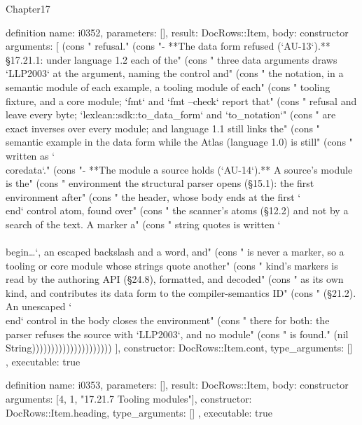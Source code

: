 \begin{lexlean}{Chapter17}
\begin{semanticmodule}
definition{
  name: i0352,
  parameters: [],
  result: DocRows::Item,
  body: constructor{
    arguments: [
      (cons "  refusal." (cons "- **The data form refused (`AU-13`).** §17.21.1: under language 1.2 each of the" (cons "  three data arguments draws `LLP2003` at the argument, naming the control and" (cons "  the notation, in a semantic module of each example, a tooling module of each" (cons "  tooling fixture, and a core module; `fmt` and `fmt --check` report that" (cons "  refusal and leave every byte; `lexlean::sdk::to_data_form` and `to_notation`" (cons "  are exact inverses over every module; and language 1.1 still links the" (cons "  semantic example in the data form while the Atlas (language 1.0) is still" (cons "  written as `\\coredata`." (cons "- **The module a source holds (`AU-14`).** A source's module is the" (cons "  environment the structural parser opens (§15.1): the first environment after" (cons "  the header, whose body ends at the first `\\end` control atom, found over" (cons "  the scanner's atoms (§12.2) and not by a search of the text. A marker a" (cons "  string quotes is written `\\\\begin{…}`, an escaped backslash and a word, and" (cons "  is never a marker, so a tooling or core module whose strings quote another" (cons "  kind's markers is read by the authoring API (§24.8), formatted, and decoded" (cons "  as its own kind, and contributes its data form to the compiler-semantics ID" (cons "  (§21.2). An unescaped `\\end` control in the body closes the environment" (cons "  there for both: the parser refuses the source with `LLP2003`, and no module" (cons "  is found." (nil String)))))))))))))))))))))
    ],
    constructor: DocRows::Item.cont,
    type_arguments: []
  },
  executable: true
}

definition{
  name: i0353,
  parameters: [],
  result: DocRows::Item,
  body: constructor{
    arguments: [4, 1, "17.21.7 Tooling modules"],
    constructor: DocRows::Item.heading,
    type_arguments: []
  },
  executable: true
}


\end{semanticmodule}
\end{lexlean}
